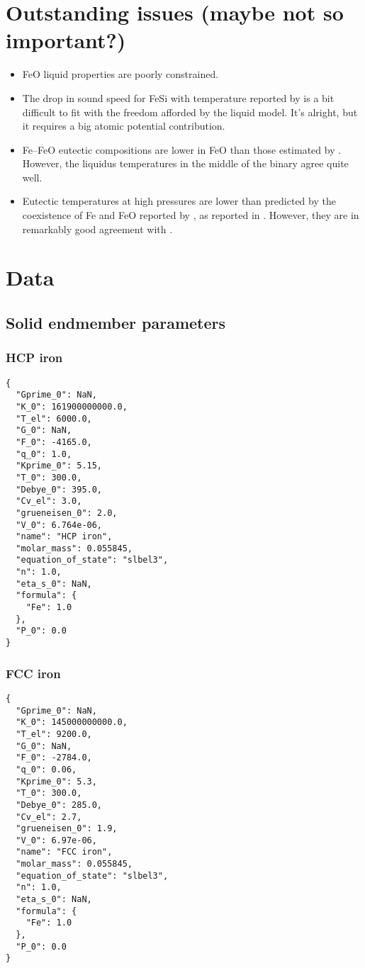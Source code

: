 \documentclass[11pt,a4paper,english]{article}
\begin{document}
\section{Outstanding issues (maybe not so important?)}
\begin{itemize}
\item FeO liquid properties are poorly constrained.
\item The drop in sound speed for FeSi with temperature reported by \citep{WMSF2015} is a bit difficult to fit with the freedom afforded by the liquid model. It's alright, but it requires a big atomic potential contribution.
\item Fe--FeO eutectic compositions are lower in FeO than those estimated by \cite{SHCPW2008}. However, the liquidus temperatures in the middle of the binary agree quite well.
\item Eutectic temperatures at high pressures are lower than predicted by the coexistence of Fe and FeO reported by \cite{OTHOH2011}, as reported in \cite{Kom2014}. However, they are in remarkably good agreement with \cite{Boehler1993}.
\end{itemize}


\section{Data}
\subsection{Solid endmember parameters}
\subsubsection{HCP iron}
\begin{lstlisting}
{
  "Gprime_0": NaN, 
  "K_0": 161900000000.0, 
  "T_el": 6000.0, 
  "G_0": NaN, 
  "F_0": -4165.0, 
  "q_0": 1.0, 
  "Kprime_0": 5.15, 
  "T_0": 300.0, 
  "Debye_0": 395.0, 
  "Cv_el": 3.0, 
  "grueneisen_0": 2.0, 
  "V_0": 6.764e-06, 
  "name": "HCP iron", 
  "molar_mass": 0.055845, 
  "equation_of_state": "slbel3", 
  "n": 1.0, 
  "eta_s_0": NaN, 
  "formula": {
    "Fe": 1.0
  }, 
  "P_0": 0.0
}
\end{lstlisting}

\subsubsection{FCC iron}
\begin{lstlisting}
{
  "Gprime_0": NaN, 
  "K_0": 145000000000.0, 
  "T_el": 9200.0, 
  "G_0": NaN, 
  "F_0": -2784.0, 
  "q_0": 0.06, 
  "Kprime_0": 5.3, 
  "T_0": 300.0, 
  "Debye_0": 285.0, 
  "Cv_el": 2.7, 
  "grueneisen_0": 1.9, 
  "V_0": 6.97e-06, 
  "name": "FCC iron", 
  "molar_mass": 0.055845, 
  "equation_of_state": "slbel3", 
  "n": 1.0, 
  "eta_s_0": NaN, 
  "formula": {
    "Fe": 1.0
  }, 
  "P_0": 0.0
}
\end{lstlisting}
\end{document}
